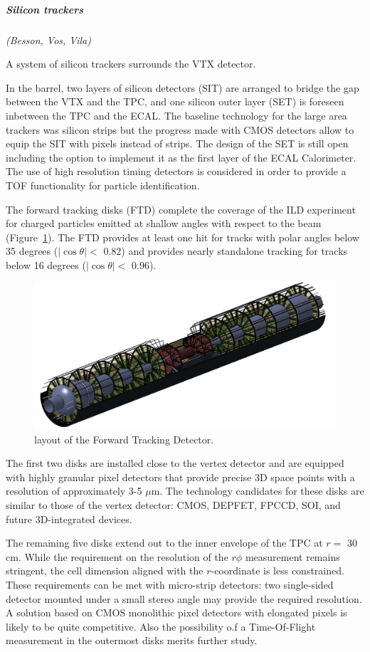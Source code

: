 \vspace{1cm}
\subparagraph*{\bf Silicon trackers}
\textit{(Besson, Vos, Vila)}

A system of silicon trackers surrounds the VTX detector. 

In the barrel, two layers of silicon detectors (SIT) are arranged to bridge the gap between the VTX and the TPC, and one silicon outer layer (SET) is foreseen inbetween the TPC and the ECAL. The baseline technology for the large area trackers was silicon strips but the progress made with CMOS detectors allow to equip the SIT with pixels instead of strips. The design of the SET is still open including the option to implement it as the first layer of the ECAL Calorimeter. The use of high resolution timing detectors is considered in order to provide a TOF functionality for particle identification. 

The forward tracking disks (FTD) complete the coverage of the ILD experiment for charged particles emitted at shallow angles with respect to the beam (Figure~\ref{fig:det:FTD}). The FTD provides at least one hit for tracks with polar angles below 35 degrees ($|\cos \theta| < $ 0.82) and provides nearly standalone tracking for tracks below 16 degrees ($|\cos \theta| <$ 0.96).

\begin{figure}[t!]
\centering
\includegraphics[width=0.75\hsize]{Detector/fig/FTD.png}
\caption{layout of the Forward Tracking Detector.}
\label{fig:det:FTD}
\end{figure}

The first two disks are installed close to the vertex detector and are equipped with highly granular pixel detectors that provide precise 3D space points with a resolution of approximately 3-5 $\mu\mathrm{m}$. The technology candidates for these disks are similar to those of the vertex detector: CMOS, DEPFET, FPCCD, SOI, and future 3D-integrated devices. 

The remaining five disks extend out to the inner envelope of the TPC at $r=$ 30 cm. While the requirement on the resolution of the $r\phi$ measurement remains stringent, the cell dimension aligned with the $r$-coordinate is less constrained. These requirements can be met with micro-strip detectors: two single-sided detector mounted under a small stereo angle may provide the required resolution. A solution based on CMOS monolithic pixel detectors with elongated pixels is likely to be quite competitive. Also the possibility o.f a Time-Of-Flight measurement in the outermost disks merits further study.


